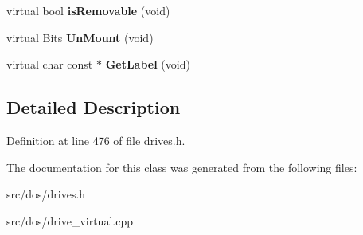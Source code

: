 \begin{DoxyCompactItemize}
\item 
\hypertarget{classVirtual__Drive_a0be0807a2cc522a60baed239a2c420fb}{virtual bool {\bfseries is\-Removable} (void)}\label{classVirtual__Drive_a0be0807a2cc522a60baed239a2c420fb}

\item 
\hypertarget{classVirtual__Drive_acc65a1146b71de3da99281217bacbb65}{virtual Bits {\bfseries Un\-Mount} (void)}\label{classVirtual__Drive_acc65a1146b71de3da99281217bacbb65}

\item 
\hypertarget{classVirtual__Drive_af75083c9925f93c99fab3c424d10f212}{virtual char const $\ast$ {\bfseries Get\-Label} (void)}\label{classVirtual__Drive_af75083c9925f93c99fab3c424d10f212}

\end{DoxyCompactItemize}


\subsection{Detailed Description}


Definition at line 476 of file drives.\-h.



The documentation for this class was generated from the following files\-:\begin{DoxyCompactItemize}
\item 
src/dos/drives.\-h\item 
src/dos/drive\-\_\-virtual.\-cpp\end{DoxyCompactItemize}
